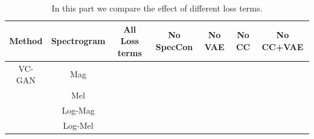 \begin{table}
    \centering
    \scriptsize
    \begin{tabular}{ccccccc}
    \toprule
    \textbf{Method} & \textbf{Spectrogram} &\textbf{All Loss terms} & \textbf{No SpecCon} & \textbf{No VAE} & \textbf{No CC} &\textbf{No CC+VAE}\\
    \midrule
     VC-GAN    & Mag & & & & \\
         & Mel & &  & &\\
         & Log-Mag & & & & \\
         & Log-Mel & & & &\\
    \bottomrule 
    \end{tabular}
    \caption{In this part we compare the effect of different loss terms.}
    \label{tab:ablation_study}
\end{table}

